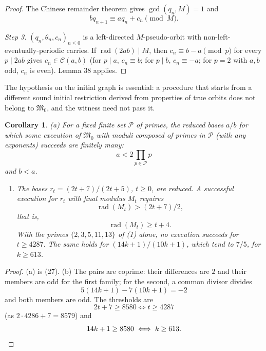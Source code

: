 \documentclass[11pt,reqno]{amsart}
\newtheorem{corollary}[theorem]{Corollary}
\theoremstyle{definition}
\theoremstyle{remark}
\providecommand{\tightlist}{\setlength{\itemsep}{0pt}\setlength{\parskip}{0pt}}
\begin{document}
\begin{proof}
The Chinese remainder theorem gives
\(\gcd(q_n,M)=1\) and
\[
bq_{n+1}\equiv aq_n+c_n\pmod M.
\]

\emph{Step 3.} \((q_n,\theta_n,c_n)_{n\le0}\) is a left-directed
\(M\)-pseudo-orbit with non-left-eventually-periodic carries. If
\(\operatorname{rad}(2ab)\mid M\), then \(c_n\equiv b-a\pmod p\) for every
\(p\mid2ab\) gives \(c_n\in\mathcal C(a,b)\) (for \(p\mid a\),
\(c_n\equiv b\); for \(p\mid b\), \(c_n\equiv-a\); for \(p=2\) with
\(a,b\) odd, \(c_n\) is even). Lemma 38 applies. \qedhere
\end{proof}

The hypothesis on the initial graph is essential: a procedure that starts
from a different sound initial restriction derived from properties of
true orbits does not belong to \(\mathfrak M_0\), and the witness need
not pass it.

\begin{samepage}
\begin{corollary}\leavevmode\label{thm:40}
(a) For a fixed finite set \(\mathcal P\) of primes,
the reduced bases \(a/b\) for which some execution of \(\mathfrak M_0\)
with moduli composed of primes in \(\mathcal P\) (with any exponents)
succeeds are finitely many:
\[
a<2\prod_{p\in\mathcal P}p
\]
and
\(b<a\).

\begin{enumerate}
\def\labelenumi{(\alph{enumi})}
\setcounter{enumi}{1}
\tightlist
\item
  The bases \(r_t=(2t+7)/(2t+5)\), \(t\ge0\), are reduced. A
  successful execution for \(r_t\) with final modulus \(M_t\) requires
  \[
  \operatorname{rad}(M_t)>(2t+7)/2,
  \]
  that is,
  \[
  \operatorname{rad}(M_t)\ge t+4.
  \]
  With the primes \(\{2,3,5,11,13\}\)
  of (1) alone, no execution succeeds for \(t\ge4287\). The same holds
  for \((14k+1)/(10k+1)\), which tend to \(7/5\), for \(k\ge613\).
\end{enumerate}
\label{thm-end:40}
\end{corollary}
\end{samepage}

\begin{proof}\leavevmode\label{proof:40}
(a) is (27). (b) The pairs are coprime: their differences are
\(2\) and their members are odd for the first family; for the second, a
common divisor divides
\[
5(14k+1)-7(10k+1)=-2
\]
and both members are
odd. The thresholds are
\[
2t+7\ge8580\iff t\ge4287
\]
(as
\(2\cdot4286+7=8579\)) and
\[
14k+1\ge8580\iff k\ge613.\qedhere
\]
\end{proof}
\end{document}
